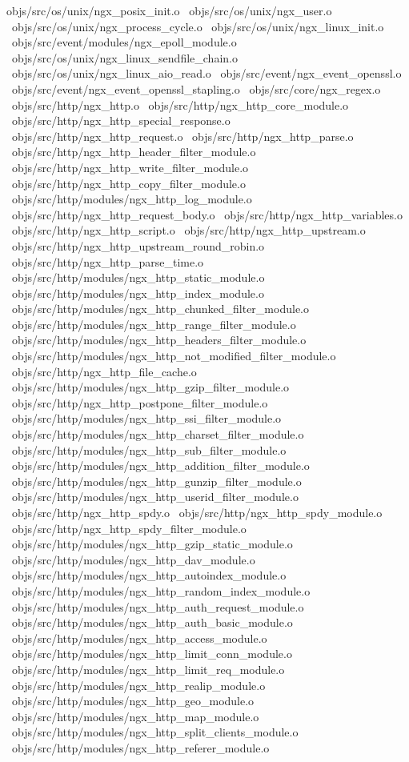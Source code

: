 objs/src/os/unix/ngx_posix_init.o \
objs/src/os/unix/ngx_user.o \
objs/src/os/unix/ngx_process_cycle.o \
objs/src/os/unix/ngx_linux_init.o \
objs/src/event/modules/ngx_epoll_module.o \
objs/src/os/unix/ngx_linux_sendfile_chain.o \
objs/src/os/unix/ngx_linux_aio_read.o \
objs/src/event/ngx_event_openssl.o \
objs/src/event/ngx_event_openssl_stapling.o \
objs/src/core/ngx_regex.o \
objs/src/http/ngx_http.o \
objs/src/http/ngx_http_core_module.o \
objs/src/http/ngx_http_special_response.o \
objs/src/http/ngx_http_request.o \
objs/src/http/ngx_http_parse.o \
objs/src/http/ngx_http_header_filter_module.o \
objs/src/http/ngx_http_write_filter_module.o \
objs/src/http/ngx_http_copy_filter_module.o \
objs/src/http/modules/ngx_http_log_module.o \
objs/src/http/ngx_http_request_body.o \
objs/src/http/ngx_http_variables.o \
objs/src/http/ngx_http_script.o \
objs/src/http/ngx_http_upstream.o \
objs/src/http/ngx_http_upstream_round_robin.o \
objs/src/http/ngx_http_parse_time.o \
objs/src/http/modules/ngx_http_static_module.o \
objs/src/http/modules/ngx_http_index_module.o \
objs/src/http/modules/ngx_http_chunked_filter_module.o \
objs/src/http/modules/ngx_http_range_filter_module.o \
objs/src/http/modules/ngx_http_headers_filter_module.o \
objs/src/http/modules/ngx_http_not_modified_filter_module.o \
objs/src/http/ngx_http_file_cache.o \
objs/src/http/modules/ngx_http_gzip_filter_module.o \
objs/src/http/ngx_http_postpone_filter_module.o \
objs/src/http/modules/ngx_http_ssi_filter_module.o \
objs/src/http/modules/ngx_http_charset_filter_module.o \
objs/src/http/modules/ngx_http_sub_filter_module.o \
objs/src/http/modules/ngx_http_addition_filter_module.o \
objs/src/http/modules/ngx_http_gunzip_filter_module.o \
objs/src/http/modules/ngx_http_userid_filter_module.o \
objs/src/http/ngx_http_spdy.o \
objs/src/http/ngx_http_spdy_module.o \
objs/src/http/ngx_http_spdy_filter_module.o \
objs/src/http/modules/ngx_http_gzip_static_module.o \
objs/src/http/modules/ngx_http_dav_module.o \
objs/src/http/modules/ngx_http_autoindex_module.o \
objs/src/http/modules/ngx_http_random_index_module.o \
objs/src/http/modules/ngx_http_auth_request_module.o \
objs/src/http/modules/ngx_http_auth_basic_module.o \
objs/src/http/modules/ngx_http_access_module.o \
objs/src/http/modules/ngx_http_limit_conn_module.o \
objs/src/http/modules/ngx_http_limit_req_module.o \
objs/src/http/modules/ngx_http_realip_module.o \
objs/src/http/modules/ngx_http_geo_module.o \
objs/src/http/modules/ngx_http_map_module.o \
objs/src/http/modules/ngx_http_split_clients_module.o \
objs/src/http/modules/ngx_http_referer_module.o \
